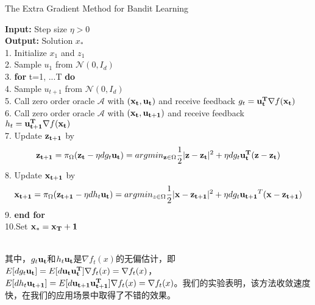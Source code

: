 \begin{algorithm}[t]
\caption{The Extra Gradient Method for Bandit Learning} %
\hspace*{0.02in} {\bf Input:} Step size $\eta > 0$ \\
\hspace*{0.02in} {\bf Output:} Solution {\bf $x_*$} \\ %
\hspace*{0.02in}1. Initialize {\bf $x_1$ }and {\bf $z_1$} \\ %
\hspace*{0.02in}2. Sample {\bf $u_1$} from $\mathcal{N}(0, I_d)$ \\ %
\hspace*{0.02in}3. {\bf for} t=1, ...T {\bf do} \\ %
\hspace*{0.02in}4. \hspace*{0.01in} Sample {\bf $u_{t+1}$} from $\mathcal{N}(0, I_d)$ \\ %
\hspace*{0.02in}5. \hspace*{0.015in} Call zero order oracle $\mathcal{A}$ with $({\bf x_t}, {\bf u_t})$ and receive feedback $g_t = {\bf u_t^T}\nabla f({\bf x_t})$ \\ 
\hspace*{0.02in}6. \hspace*{0.015in} Call zero order oracle $\mathcal{A}$ with $({\bf x_t}, {\bf u_{t+1}})$ and receive feedback $h_t = {\bf u_{t+1}^T}\nabla f({\bf x_t})$ \\ %
\hspace*{0.02in}7. \hspace*{0.01in} Update ${\bf z_{t+1}}$ by \\ %
$$
{\bf z_{t+1} }= \pi_\Omega({\bf z_t}-\eta dg_t{\bf u_t}) = argmin_{{\bf z }\in \Omega} \frac{1}{2}|{\bf z}-{\bf z_t}|^2 + \eta dg_t{\bf u_t^T}({\bf z}-{\bf z_t})
$$
\hspace*{0.02in}8. \hspace*{0.01in} Update ${\bf x_{t+1}}$ by \\ %
$$
{\bf x_{t+1}}  = \pi_\Omega({\bf z_{t+1}} -\eta dh_t{\bf u_t}) = argmin_{z \in \Omega} \frac{1}{2}|{\bf x} -{\bf z_{t+1}}|^2 + \eta dg_t{\bf u_{t+1}}^T({\bf x}-{\bf z_{t+1}})
$$
\hspace*{0.02in}9. {\bf end for} \\
\hspace*{0.02in}10.Set ${\bf x_* = x_T+1}$
\end{algorithm} \\
其中，$g_t{\bf u_t}$和$h_t{\bf u_t}$是$\nabla f_t(x)$的无偏估计，即$E[dg_t{\bf u_t}] = E[d{\bf u_t u_t^T}]\nabla f_t(x) = \nabla f_t(x)$，$E[dh_t{\bf u_{t+1}}] = E[d{\bf u_{t+1} u_{t+1}^T}]\nabla f_t(x) = \nabla f_t(x)$。我们的实验表明，该方法收敛速度快，在我们的应用场景中取得了不错的效果。\\

